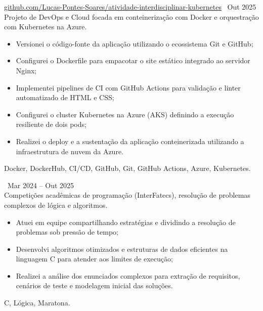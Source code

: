         
 \textbar{}  \href{https://github.com/Lucas-Pontes-Soares/atividade-interdisciplinar-kubernetes}{github.com/Lucas-Pontes-Soares/atividade-interdisciplinar-kubernetes} \hfill\ Out 2025 \\
Projeto de DevOps e Cloud focada em conteinerização com Docker e orquestração com Kubernetes na Azure.
\begin{itemize}
    \item Versionei o código-fonte da aplicação utilizando o ecossistema Git e GitHub;
    \item Configurei o Dockerfile para empacotar o site estático integrado ao servidor Nginx;
    \item Implementei pipelines de CI com GitHub Actions para validação e linter automatizado de HTML e CSS;
    \item Configurei o cluster Kubernetes na Azure (AKS) definindo a execução resiliente de dois pods;
    \item Realizei o deploy e a sustentação da aplicação conteinerizada utilizando a infraestrutura de nuvem da Azure.
\end{itemize}
 Docker, DockerHub, CI/CD, GitHub, Git, GitHub Actions, Azure, Kubernetes.

        
 \hfill\ Mar 2024 -- Out 2025 \\
Competições acadêmicas de programação (InterFatecs), resolução de problemas complexos de lógica e algoritmos.
\begin{itemize}
    \item Atuei em equipe compartilhando estratégias e dividindo a resolução de problemas sob pressão de tempo;
    \item Desenvolvi algoritmos otimizados e estruturas de dados eficientes na linguagem C para atender aos limites de execução;
    \item Realizei a análise dos enunciados complexos para extração de requisitos, cenários de teste e modelagem inicial das soluções.
\end{itemize}
 C, Lógica, Maratona.

        
